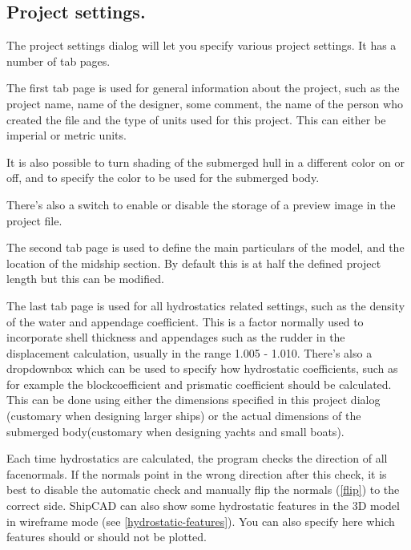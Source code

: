 \documentclass[12pt]{article}
\begin{document}
\subsection{Project settings.} \label{project-settings}
The project settings dialog will let you specify various project
settings. It has a number of tab pages.

The first tab page is used for general information about the
project, such as the project name, name of the designer, some
comment, the name of the person who created the file and the
type of units used for this project. This can either be imperial or
metric units.

It is also possible to turn shading of the submerged hull in a
different color on or off, and to specify the color to be used for the
submerged body.

There's also a switch to enable or disable the storage of a
preview image in the project file.

The second tab page is used to define the main particulars of the
model, and the location of the midship section. By default this is
at half the defined project length but this can be modified.

The last tab page is used for all hydrostatics related settings, such
as the density of the water and appendage coefficient. This is a
factor normally used to incorporate shell thickness and appendages
such as the rudder in the displacement calculation, usually in the
range 1.005 - 1.010. There's also a dropdownbox which can be used to
specify how hydrostatic coefficients, such as for example the
blockcoefficient and prismatic coefficient should be calculated. This
can be done using either the dimensions specified in this project
dialog (customary when designing larger ships) or the actual
dimensions of the submerged body(customary when designing yachts and
small boats).

Each time hydrostatics are calculated, the program checks the
direction of all facenormals. If the normals point in the wrong
direction after this check, it is best to disable the automatic check
and manually flip the normals (\ref{flip}) to the correct side.  ShipCAD
can also show some hydrostatic features in the 3D model in wireframe
mode (see \ref{hydrostatic-features}). You can also specify here which
features should or should not be plotted.
\end{document}
